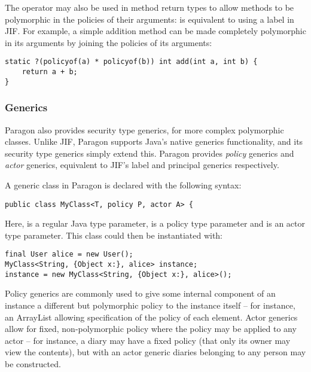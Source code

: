 The  operator may also be used in method return types to allow methods to be polymorphic in the policies of their arguments:  is equivalent to using a  label in JIF. For example, a simple addition method can be made completely polymorphic in its arguments by joining the policies of its arguments:

\begin{verbatim}
static ?(policyof(a) * policyof(b)) int add(int a, int b) {
	return a + b;
}
\end{verbatim}

\subsubsection{Generics}

Paragon also provides security type generics, for more complex polymorphic classes. Unlike JIF, Paragon supports Java's native generics functionality, and its security type generics simply extend this. Paragon provides \textit{policy} generics and \textit{actor} generics, equivalent to JIF's label and principal generics respectively.

A generic class in Paragon is declared with the following syntax:

\begin{verbatim}
public class MyClass<T, policy P, actor A> {
\end{verbatim}

Here,  is a regular Java type parameter,  is a policy type parameter and  is an actor type parameter. This class could then be instantiated with:

\begin{verbatim}
final User alice = new User();
MyClass<String, {Object x:}, alice> instance;
instance = new MyClass<String, {Object x:}, alice>();
\end{verbatim}

Policy generics are commonly used to give some internal component of an instance a different but polymorphic policy to the instance itself -- for instance, an ArrayList allowing specification of the policy of each element. Actor generics allow for fixed, non-polymorphic policy where the policy may be applied to any actor -- for instance, a diary may have a fixed policy (that only its owner may view the contents), but with an actor generic diaries belonging to any person may be constructed.

\clearpage

